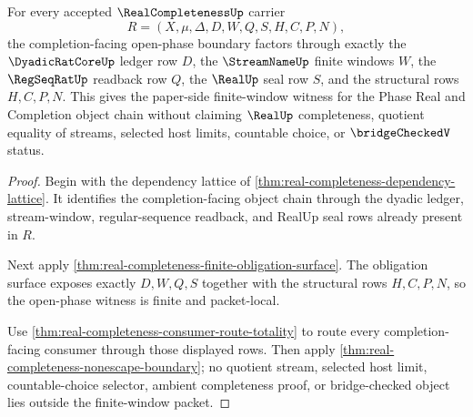 \begin{theorem}
\label{thm:real-completeness-finite-window-open-phase-exit}
For every accepted $\RealCompletenessUp$ carrier
$$
R=(X,\mu,\Delta,D,W,Q,S,H,C,P,N),
$$
the completion-facing open-phase boundary factors through exactly the $\DyadicRatCoreUp$ ledger row $D$, the $\StreamNameUp$ finite windows $W$, the $\RegSeqRatUp$ readback row $Q$, the $\RealUp$ seal row $S$, and the structural rows $H,C,P,N$. This gives the paper-side finite-window witness for the Phase Real and Completion object chain without claiming $\RealUp$ completeness, quotient equality of streams, selected host limits, countable choice, or $\bridgeCheckedV$ status.
\end{theorem}
\begin{proof}
Begin with the dependency lattice of \autoref{thm:real-completeness-dependency-lattice}. It identifies the completion-facing object chain through the dyadic ledger, stream-window, regular-sequence readback, and RealUp seal rows already present in $R$.

Next apply \autoref{thm:real-completeness-finite-obligation-surface}. The obligation surface exposes exactly $D,W,Q,S$ together with the structural rows $H,C,P,N$, so the open-phase witness is finite and packet-local.

Use \autoref{thm:real-completeness-consumer-route-totality} to route every completion-facing consumer through those displayed rows. Then apply \autoref{thm:real-completeness-nonescape-boundary}; no quotient stream, selected host limit, countable-choice selector, ambient completeness proof, or bridge-checked object lies outside the finite-window packet.
\end{proof}

